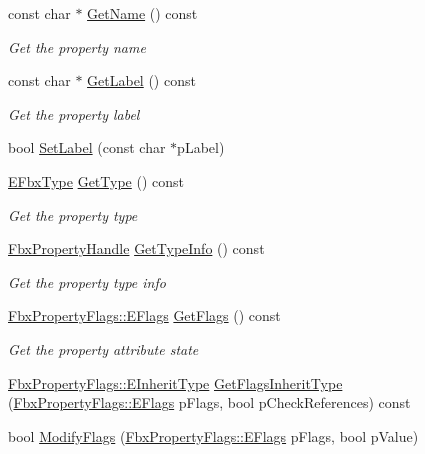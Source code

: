 \begin{Indent}
\begin{DoxyCompactItemize}
const char $\ast$ \hyperlink{class_fbx_property_handle_a38a846122c8564c62fb58426235b12e6}{Get\+Name} () const
\begin{DoxyCompactList}\small\item\em Get the property name \end{DoxyCompactList}\item 
const char $\ast$ \hyperlink{class_fbx_property_handle_a2ae2817fc9113f00ad3b212de3acfad7}{Get\+Label} () const
\begin{DoxyCompactList}\small\item\em Get the property label \end{DoxyCompactList}\item 
bool \hyperlink{class_fbx_property_handle_a501ee2ee91a27619728afeb7d69b5936}{Set\+Label} (const char $\ast$p\+Label)
\item 
\hyperlink{fbxpropertytypes_8h_a73913a5ddfb20e57c6f25e9e6784bd92}{E\+Fbx\+Type} \hyperlink{class_fbx_property_handle_a4f2ce11ebf2828418cb1d3d65feb341f}{Get\+Type} () const
\begin{DoxyCompactList}\small\item\em Get the property type \end{DoxyCompactList}\item 
\hyperlink{class_fbx_property_handle}{Fbx\+Property\+Handle} \hyperlink{class_fbx_property_handle_a84818af34da6e4d496e2d7e787c5a758}{Get\+Type\+Info} () const
\begin{DoxyCompactList}\small\item\em Get the property type info \end{DoxyCompactList}\item 
\hyperlink{class_fbx_property_flags_afabfa7e0949aac8a7dcdf8a141867e99}{Fbx\+Property\+Flags\+::\+E\+Flags} \hyperlink{class_fbx_property_handle_a3283a9c3b0cca5cdb058751a90d794c2}{Get\+Flags} () const
\begin{DoxyCompactList}\small\item\em Get the property attribute state \end{DoxyCompactList}\item 
\hyperlink{class_fbx_property_flags_ae3b667a4fcac4b827fa186a698fec2f8}{Fbx\+Property\+Flags\+::\+E\+Inherit\+Type} \hyperlink{class_fbx_property_handle_a90978a4383e1fc31bca8944dc35e39cd}{Get\+Flags\+Inherit\+Type} (\hyperlink{class_fbx_property_flags_afabfa7e0949aac8a7dcdf8a141867e99}{Fbx\+Property\+Flags\+::\+E\+Flags} p\+Flags, bool p\+Check\+References) const
\item 
bool \hyperlink{class_fbx_property_handle_aa5f4add93321ecbb6afb016bbf9ecc21}{Modify\+Flags} (\hyperlink{class_fbx_property_flags_afabfa7e0949aac8a7dcdf8a141867e99}{Fbx\+Property\+Flags\+::\+E\+Flags} p\+Flags, bool p\+Value)

\end{DoxyCompactItemize}
\end{Indent}
